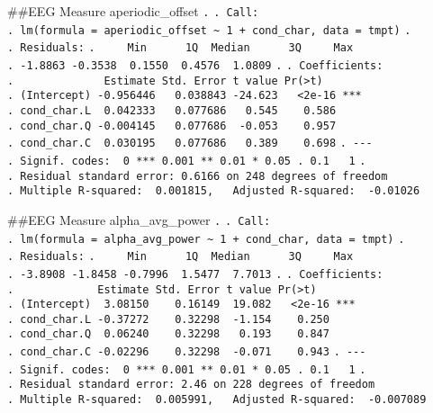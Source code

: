 \documentclass[
]{article}
\begin{document}
\#\#EEG Measure aperiodic\_offset \texttt{.} \texttt{.\ Call:}
\texttt{.\ lm(formula\ =\ aperiodic\_offset\ \textasciitilde{}\ 1\ +\ cond\_char,\ data\ =\ tmpt)}
\texttt{.} \texttt{.\ Residuals:}
\texttt{.\ \ \ \ \ Min\ \ \ \ \ \ 1Q\ \ Median\ \ \ \ \ \ 3Q\ \ \ \ \ Max}
\texttt{.\ -1.8863\ -0.3538\ \ 0.1550\ \ 0.4576\ \ 1.0809} \texttt{.}
\texttt{.\ Coefficients:}
\texttt{.\ \ \ \ \ \ \ \ \ \ \ \ \ \ Estimate\ Std.\ Error\ t\ value\ Pr(\textgreater{}\textbar{}t\textbar{})}
\texttt{.\ (Intercept)\ -0.956446\ \ \ 0.038843\ -24.623\ \ \ \textless{}2e-16\ ***}
\texttt{.\ cond\_char.L\ \ 0.042333\ \ \ 0.077686\ \ \ 0.545\ \ \ \ 0.586}
\texttt{.\ cond\_char.Q\ -0.004145\ \ \ 0.077686\ \ -0.053\ \ \ \ 0.957}
\texttt{.\ cond\_char.C\ \ 0.030195\ \ \ 0.077686\ \ \ 0.389\ \ \ \ 0.698}
\texttt{.\ -\/-\/-}
\texttt{.\ Signif.\ codes:\ \ 0\ \textquotesingle{}***\textquotesingle{}\ 0.001\ \textquotesingle{}**\textquotesingle{}\ 0.01\ \textquotesingle{}*\textquotesingle{}\ 0.05\ \textquotesingle{}.\textquotesingle{}\ 0.1\ \textquotesingle{}\ \textquotesingle{}\ 1}
\texttt{.}
\texttt{.\ Residual\ standard\ error:\ 0.6166\ on\ 248\ degrees\ of\ freedom}
\texttt{.\ Multiple\ R-squared:\ \ 0.001815,\ \ \ Adjusted\ R-squared:\ \ -0.01026}

\#\#EEG Measure alpha\_avg\_power \texttt{.} \texttt{.\ Call:}
\texttt{.\ lm(formula\ =\ alpha\_avg\_power\ \textasciitilde{}\ 1\ +\ cond\_char,\ data\ =\ tmpt)}
\texttt{.} \texttt{.\ Residuals:}
\texttt{.\ \ \ \ \ Min\ \ \ \ \ \ 1Q\ \ Median\ \ \ \ \ \ 3Q\ \ \ \ \ Max}
\texttt{.\ -3.8908\ -1.8458\ -0.7996\ \ 1.5477\ \ 7.7013} \texttt{.}
\texttt{.\ Coefficients:}
\texttt{.\ \ \ \ \ \ \ \ \ \ \ \ \ Estimate\ Std.\ Error\ t\ value\ Pr(\textgreater{}\textbar{}t\textbar{})}
\texttt{.\ (Intercept)\ \ 3.08150\ \ \ \ 0.16149\ \ 19.082\ \ \ \textless{}2e-16\ ***}
\texttt{.\ cond\_char.L\ -0.37272\ \ \ \ 0.32298\ \ -1.154\ \ \ \ 0.250}
\texttt{.\ cond\_char.Q\ \ 0.06240\ \ \ \ 0.32298\ \ \ 0.193\ \ \ \ 0.847}
\texttt{.\ cond\_char.C\ -0.02296\ \ \ \ 0.32298\ \ -0.071\ \ \ \ 0.943}
\texttt{.\ -\/-\/-}
\texttt{.\ Signif.\ codes:\ \ 0\ \textquotesingle{}***\textquotesingle{}\ 0.001\ \textquotesingle{}**\textquotesingle{}\ 0.01\ \textquotesingle{}*\textquotesingle{}\ 0.05\ \textquotesingle{}.\textquotesingle{}\ 0.1\ \textquotesingle{}\ \textquotesingle{}\ 1}
\texttt{.}
\texttt{.\ Residual\ standard\ error:\ 2.46\ on\ 228\ degrees\ of\ freedom}
\texttt{.\ Multiple\ R-squared:\ \ 0.005991,\ \ \ Adjusted\ R-squared:\ \ -0.007089}
\end{document}
